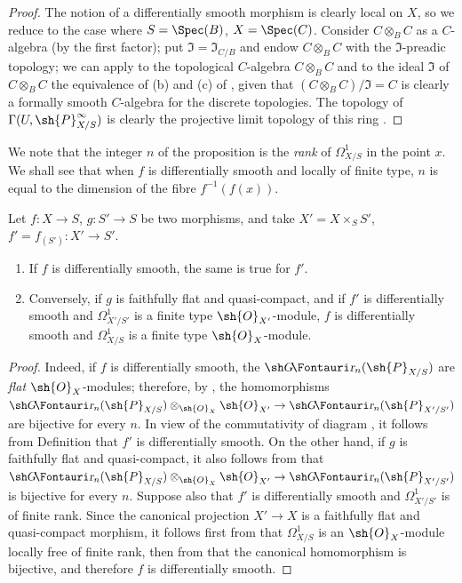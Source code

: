 \begin{proof}
The notion of a differentially smooth morphism is clearly local on $X$, so we reduce to the case where $S = \Spec(B)$, $X = \Spec(C)$.
Consider $C \otimes_B C$ as a $C$-algebra (by the first factor);
put $\mathfrak{I} = \mathfrak{I}_{C/B}$ and endow $C \otimes_B C$ with the $\mathfrak{I}$-preadic topology;
we can apply to the topological $C$-algebra $C \otimes_B C$ and to the ideal $\mathfrak{I}$ of $C \otimes_B C$ the equivalence of (b) and (c) of , given that $(C \otimes_B C)/\mathfrak{I} = C$ is clearly a formally smooth $C$-algebra for the discrete topologies.
The topology of $\Gamma(U, \sh{P}_{X/S}^\infty)$ is clearly the projective limit topology of this ring .
\end{proof}

We note that the integer $n$ of the proposition  is the \emph{rank} of $\Omega_{X/S}^1$ in the point $x$.
We shall see  that when $f$ is differentially smooth and locally of finite type, $n$ is equal to the dimension of the fibre $f^{-1}(f(x))$. 

\begin{proposition}[16.10.4]
\label{IV.16.10.4}
Let $f:X \to S$, $g:S' \to S$ be two morphisms, and take $X' = X \times_S S'$, $f' = f_{(S')}:X' \to S'$.
\begin{enumerate}
  \item[\rm{(i)}] If $f$ is differentially smooth, the same is true for $f'$. 
  \item[\rm{(ii)}] Conversely, if $g$ is faithfully flat and quasi-compact, and if $f'$ is differentially smooth and $\Omega_{X'/S'}^1$ is a finite type $\sh{O}_{X'}$-module, $f$ is differentially smooth and $\Omega_{X/S}^1$ is a finite type $\sh{O}_X$-module.
\end{enumerate}
\end{proposition}

\begin{proof}
Indeed, if $f$ is differentially smooth, the $\shGr_n(\sh{P}_{X/S})$ are \emph{flat} $\sh{O}_X$-modules;
therefore, by , the homomorphisms $\shGr_n(\sh{P}_{X/S}) \otimes_{\sh{O}_X} \sh{O}_{X'} \to \shGr_n(\sh{P}_{X'/S'})$ are bijective for every $n$. In view of the commutativity of diagram , it follows from Definition  that $f'$ is differentially smooth.
On the other hand, if $g$ is faithfully flat and quasi-compact, it also follows from  that $\shGr_n(\sh{P}_{X/S}) \otimes_{\sh{O}_X} \sh{O}_{X'} \to \shGr_n(\sh{P}_{X'/S'})$ is bijective for every $n$.
Suppose also that $f'$ is differentially smooth and $\Omega_{X'/S'}^1$ is of finite rank.
Since the canonical projection $X' \to X$ is a faithfully flat and quasi-compact morphism, it follows first from  that $\Omega_{X/S}^1$ is an $\sh{O}_X$-module locally free of finite rank, then from  that the canonical homomorphism  is bijective, and therefore $f$ is differentially smooth.
\end{proof}

